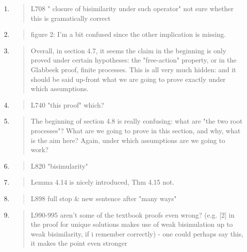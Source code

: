 \begin{enumerate}
\item \begin{quote}
    L708 " closure of bisimilarity under such operator" not sure whether this is gramatically correct
  \end{quote}

\item \begin{quote}
    figure 2: I'm a bit confused since the other implication is missing. 
  \end{quote}

\item \begin{quote}
    Overall, in section 4.7, it seems the claim in the beginning is
    only proved under certain hypotheses: the "free-action" property,
    or in the Glabbeek proof, finite processes. This is all very much
    hidden: and it should be said up-front what we are going to prove
    exactly under which assumptions.
  \end{quote}

\item \begin{quote}
    L740 "this proof" which? 
  \end{quote}

\item \begin{quote}
    The beginning of section 4.8 is really confusing: what are "the
    two root processes"? What are we going to prove in this section,
    and why, what is the aim here? Again, under which assumptions are
    we going to work?
  \end{quote}

\item \begin{quote}
    L820 "bisimularity"
  \end{quote}

\item \begin{quote}
    Lemma 4.14 is nicely introduced, Thm 4.15 not. 
  \end{quote}

\item \begin{quote}
    L898 full stop \& new sentence after "many ways"
  \end{quote}

\item \begin{quote}
    L990-995 aren't some of the textbook proofs even wrong? (e.g. [2]
    in the proof for unique solutions makes use of weak bisimulation
    up to weak bisimilarity, if i remember correctly) - one could
    perhaps say this, it makes the point even stronger
  \end{quote}

\end{enumerate}

